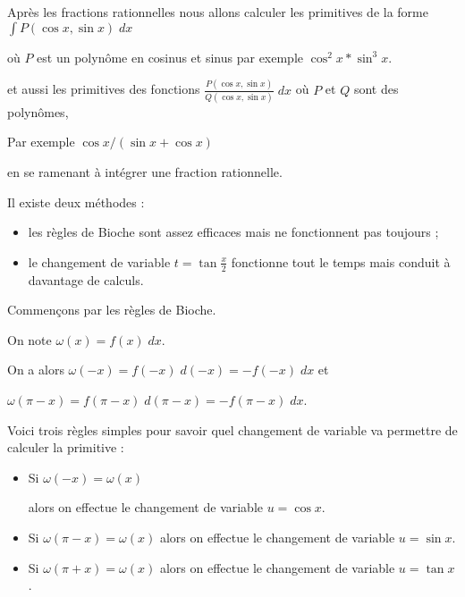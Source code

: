 \diapo

Après les fractions rationnelles nous allons
calculer les primitives de la forme $\int P(\cos x,\sin x)\;dx$ 

où $P$ est un polynôme en cosinus et sinus par exemple $\cos^2x*\sin^3x$.

\change


et aussi les primitives des fonctions
$ \frac{P(\cos x,\sin x)}{Q(\cos x, \sin x)}\;dx$
où $P$ et $Q$ sont des polynômes,

Par exemple $\cos x/(\sin x + \cos x)$

 en se ramenant à intégrer une fraction rationnelle.



Il existe deux méthodes : 
\begin{itemize}
  \item les règles de Bioche sont assez efficaces mais ne fonctionnent pas toujours ;


  \item le changement de variable $t = \tan \frac x2$ fonctionne tout le temps mais conduit à davantage de calculs.
\end{itemize}

\change

Commençons par les règles de Bioche.

\change

On note $\omega(x) = f(x)\;dx$.

\change

On a alors $\omega(-x)= f(-x)\;d(-x)=-f(-x)\;dx$ et

\change

$\omega (\pi-x)= f(\pi-x)\;d(\pi-x)=-f(\pi-x)\;dx$.

\change

Voici trois règles simples pour savoir quel changement de variable 
va permettre de calculer la primitive :

\begin{itemize}
  \item Si $\omega(-x)=\omega(x)$ 

\change

alors on effectue le changement de variable $u=\cos x$.

\change

  \item Si $\omega(\pi-x)=\omega(x)$ alors on effectue le changement de variable $u=\sin x$.

\change

  \item Si $\omega(\pi + x)=\omega(x)$ alors on effectue le changement de variable $u=\tan x$.
\end{itemize}

